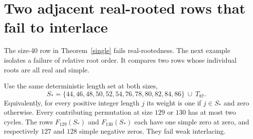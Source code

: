 \section{Two adjacent real-rooted rows that fail to interlace}
The size-40 row in Theorem~\ref{single} fails real-rootedness. The next example isolates a failure of relative root order. It compares two rows whose individual roots are all real and simple.

\begin{theorem}\label{two-cycle}
Use the same deterministic length set at both sizes,
\[
 S_\ast=\{44,46,48,50,52,54,76,78,80,82,84,86\}\ \cup\ T_{87}.
\]
Equivalently, for every positive integer length $j$ its weight is one if $j\in S_\ast$ and zero otherwise. Every contributing permutation at size $129$ or $130$ has at most two cycles. The rows $F_{129}(S_\ast)$ and $F_{130}(S_\ast)$ each have one simple zero at zero, and respectively $127$ and $128$ simple negative zeros. They fail weak interlacing.
\end{theorem}

